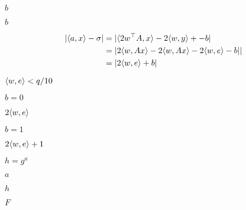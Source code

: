 \documentclass[10pt]{book}
\begin{document}
\begin{mdSnippets}
\begin{mdInlineSnippet}
$b$\end{mdInlineSnippet}%
\begin{mdInlineSnippet}%
$b$\end{mdInlineSnippet}%
\begin{mdDisplaySnippet}%
\[%
\begin{aligned}
|\iprod{a,x} - \sigma| &= |\iprod{2w^\top A, x}- 2\iprod{w,y} +- b| \\
&= |2\iprod{w,Ax} - 2\iprod{w,Ax} - 2\iprod{w,e} - b|| \\
&= |2\iprod{w,e} + b| 
\end{aligned}
\]%
\end{mdDisplaySnippet}%
\begin{mdInlineSnippet}%
$\langle w,e \rangle < q/10$\end{mdInlineSnippet}%
\begin{mdInlineSnippet}[2cd846c62474f70be3291ce24c1bcf6a]%
$b = 0$\end{mdInlineSnippet}%
\begin{mdInlineSnippet}[922dda8419f3895c96e354e4c91b4e81]%
$2\langle w,e \rangle$\end{mdInlineSnippet}%
\begin{mdInlineSnippet}[d8a35c47c0f29d1f868a2769cd3003c5]%
$b = 1$\end{mdInlineSnippet}%
\begin{mdInlineSnippet}[db8046a756b4a2a3c1ba5de7ebf64716]%
$2\langle w,e \rangle + 1$\end{mdInlineSnippet}%
\begin{mdInlineSnippet}[db8b3bf1a9c14e73f9e6ff0ebdbf00f5]%
$h=g^a$\end{mdInlineSnippet}%
\begin{mdInlineSnippet}[0cc175b9c0f1b6a831c399e269772661]%
$a$\end{mdInlineSnippet}%
\begin{mdInlineSnippet}[2510c39011c5be704182423e3a695e91]%
$h$\end{mdInlineSnippet}%
\begin{mdInlineSnippet}[800618943025315f869e4e1f09471012]%
$F$\end{mdInlineSnippet}%

\end{mdSnippets}
\end{document}
